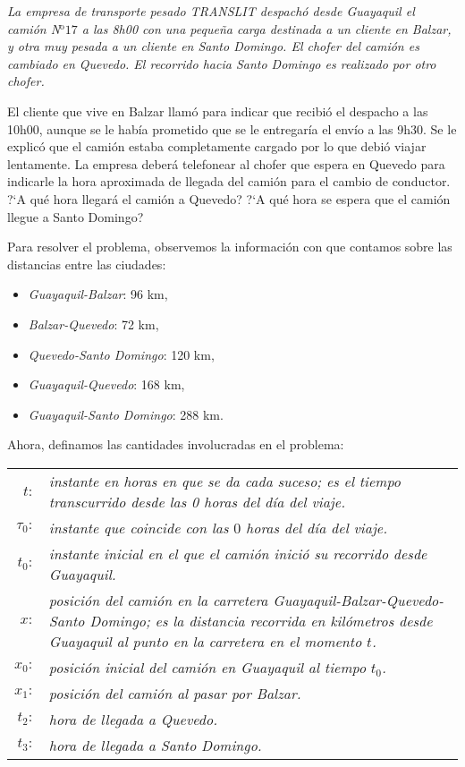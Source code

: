 \begin{exemplo}[]{}
\begingroup
\itshape La empresa de transporte pesado TRANSLIT despachó desde Guayaquil el camión N$^\text{o
}17$ a las 8h00 con una pequeña carga destinada a un cliente en Balzar, y otra muy pesada a un
cliente en Santo Domingo. El chofer del camión es cambiado en Quevedo. El recorrido hacia Santo
Domingo es realizado por otro chofer.

El cliente que vive en Balzar llamó para indicar que recibió el despacho a las 10h00, aunque se le
había prometido que se le entregaría el envío a las 9h30. Se le explicó que el camión estaba
completamente cargado por lo que debió viajar lentamente. La empresa deberá telefonear al chofer
que espera en Quevedo para indicarle la hora aproximada de llegada del camión para el cambio de
conductor. ?`A qué hora llegará el camión a Quevedo? ?`A qué hora se espera que el camión llegue a
Santo Domingo?
\endgroup

\vspace{0.6\baselineskip}%
Para resolver el problema, observemos la información con que contamos
sobre las distancias entre las ciudades:
\begin{itemize}
\item \emph{Guayaquil-Balzar}: 96 km,
\item \emph{Balzar-Quevedo}: 72 km,
\item \emph{Quevedo-Santo Domingo}: 120 km,
\item \emph{Guayaquil-Quevedo}: 168 km,
\item \emph{Guayaquil-Santo Domingo}: 288 km.
\end{itemize}

Ahora, definamos las cantidades involucradas en el problema:\vspace{\baselineskip}\\
{\setlength\tabcolsep{3pt}
\begin{tabular}{r p{}}
  $t:$ & \textsl{instante en horas en que se da cada suceso; es el tiempo transcurrido desde las 0 horas
    del día del viaje.}\\
  $\tau_0:$ & \textsl{instante que coincide con las $0$ horas del día del viaje.}\\
  $t_0:$ & \textsl{instante inicial en el que el camión inició su recorrido desde
    Guayaquil.}\\
  $x:$ & \textsl{posición del camión en la carretera Guayaquil-Balzar-Quevedo-Santo Domingo;
    es la distancia recorrida en kilómetros desde Guayaquil al punto en la carretera en el momento $t$.}\\
  $x_0:$ & \textsl{posición inicial del camión  en Guayaquil al tiempo $t_0$.}\\
  $x_1:$ & \textsl{posición  del camión al pasar por Balzar.}\\
  $t_2:$ & \textsl{hora de llegada a Quevedo.}\\
  $t_3:$ & \textsl{hora de llegada a Santo Domingo.}
\end{tabular}}
\vspace{\baselineskip}


\end{exemplo}
